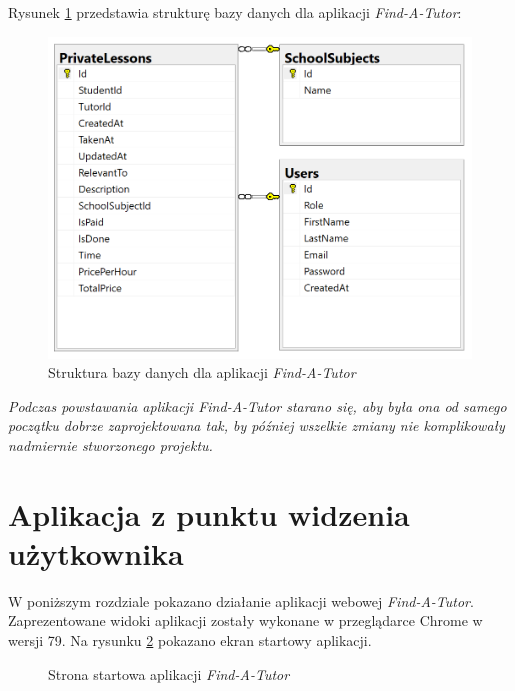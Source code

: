 \documentclass[12pt]{article}
\numberwithin{figure}{section}
\begin{document}
\begin{sloppypar}
Rysunek \ref{fig:db} przedstawia strukturę bazy danych dla aplikacji \textit{Find-A-Tutor}: 
\begin{figure}[H] 
    \centering
    \includegraphics[width=.8\textwidth]{images/chapter_3/db.png}
    \caption{Struktura bazy danych dla aplikacji \textit{Find-A-Tutor}}
    \label{fig:db}
\end{figure}
    
\textit{Podczas powstawania aplikacji Find-A-Tutor starano się, aby była ona od samego początku dobrze zaprojektowana tak, by później wszelkie zmiany nie komplikowały nadmiernie stworzonego projektu.}

\newpage
\section{Aplikacja z punktu widzenia użytkownika}
W poniższym rozdziale pokazano działanie aplikacji webowej \textit{Find-A-Tutor}. Zaprezentowane widoki aplikacji zostały wykonane w przeglądarce Chrome w wersji 79. Na rysunku \ref{fig:home} pokazano ekran startowy aplikacji.

\begin{figure}[!htbp] 
    \centering
    \caption{Strona startowa aplikacji \textit{Find-A-Tutor}}
    \label{fig:home}
\end{figure}


\end{sloppypar}
\end{document}
